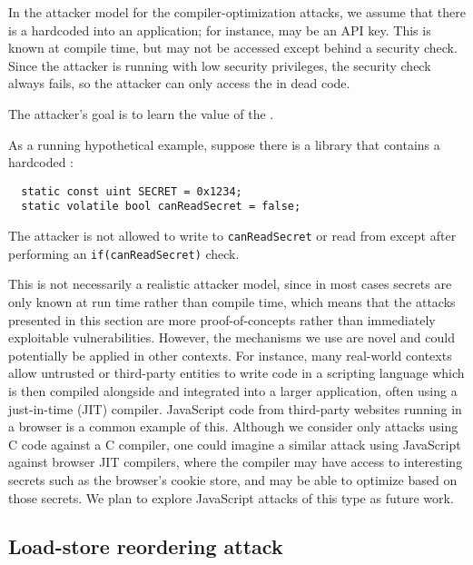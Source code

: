 In the attacker model for the compiler-optimization attacks, we assume that
there is a {\SEC} hardcoded into an application; for instance, {\SEC} may be
an API key.
This {\SEC} is known at compile time, but may not be
accessed except behind a security check.
Since the attacker is running with low security privileges,
the security check always fails,
so the attacker can only access the {\SEC} in dead code.
The attacker's goal is to learn the value of the {\SEC}.

As a running hypothetical example, suppose there is a library that contains
a hardcoded {\SEC}: %
\begin{verbatim}
  static const uint SECRET = 0x1234;
  static volatile bool canReadSecret = false;
\end{verbatim}
The attacker is not allowed to write to \verb|canReadSecret| or read from {\SEC}
except after performing an \verb|if(canReadSecret)| check.

This is not necessarily a realistic attacker model,
since in most cases secrets are only known at run time rather than compile time,
which means that the attacks presented in this section
are more proof-of-concepts rather than immediately exploitable vulnerabilities.
However, the mechanisms we use are novel and could potentially be applied
in other contexts.
For instance, many real-world contexts allow untrusted or
third-party entities to write code in a scripting language which is then
compiled alongside and integrated into a larger application, often
using a just-in-time (JIT) compiler.
JavaScript code from third-party websites running in a browser is a common
example of this.
Although we consider only attacks using C code against a C compiler,
one could imagine a similar attack using JavaScript against browser JIT
compilers, where the compiler may have access to interesting secrets such as the
browser's cookie store, and may be able to optimize based on those secrets.
We plan to explore JavaScript attacks of this type as future work.

\subsection{Load-store reordering attack}
\label{subsec:exp-rel-mem}

